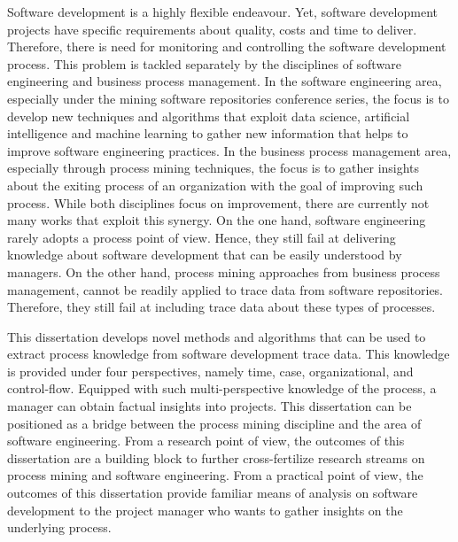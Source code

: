 

Software development is a highly flexible endeavour. Yet, software development projects
have specific requirements about quality, costs and time to deliver. Therefore, there is need
for monitoring and controlling the software development process. This problem is tackled
separately by the disciplines of software engineering and business process management. In the software engineering area, especially under the mining software repositories conference series, the focus is to develop new techniques and algorithms that exploit data science, artificial intelligence and machine learning to gather new information that helps to improve software engineering practices. In the business process management area, especially through process mining techniques, the focus is to gather insights about the exiting process of an organization with the goal of improving such process. While both disciplines focus on improvement, there are currently not many works that exploit this synergy.
On the one hand, software engineering rarely adopts a process point of view. Hence, they still fail at delivering knowledge about software development that can be easily understood by managers. On the other hand, process mining approaches from business process management, cannot be readily applied to trace data from software repositories. Therefore, they still fail at including trace data about these types of processes. 
 
This dissertation develops novel methods and algorithms that can be used to extract process knowledge from software development trace data. This knowledge is provided under four perspectives, namely time, case, organizational, and control-flow. Equipped with such multi-perspective knowledge of the process, a manager can obtain factual insights into projects. This dissertation can be positioned as a bridge between the process mining discipline and the area of software engineering. From a research point of view, the outcomes of this dissertation are a building block to further cross-fertilize research streams on process mining and software engineering. From a practical
point of view, the outcomes of this dissertation provide familiar means of analysis on software development to the project manager who wants to gather insights on the underlying process.

